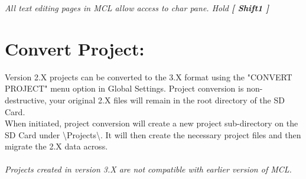 \textit{All text editing pages in MCL allow access to char pane. Hold \textbf{[ Shift1 ]}}

\section{Convert Project:}
Version 2.X projects can be converted to the 3.X format using the "CONVERT PROJECT"
menu option in Global Settings. Project conversion is non-destructive, your original 2.X
files will remain in the root directory of the SD Card.\\

When initiated, project conversion will create a new project sub-directory on the SD Card under \textbackslash Projects\textbackslash. It will then create the necessary project files and then migrate the 2.X data across.\\\\
\textit{Projects created in version 3.X are not compatible with earlier version of MCL.}